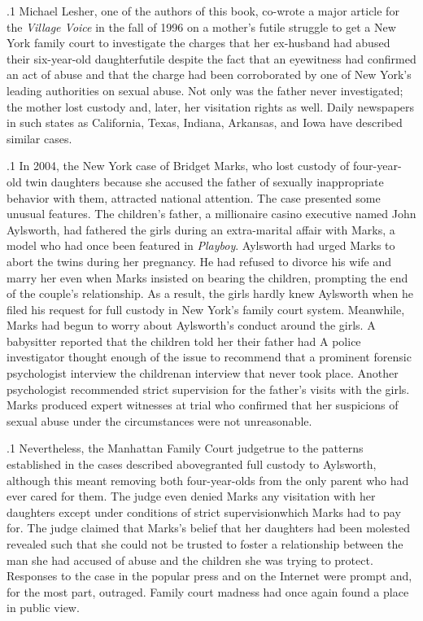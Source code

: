 \documentclass[11pt, twoside]{article}
\begin{document}
{\p.1{%
Michael Lesher, one of the authors of this book, co-wrote
a major article for the \textit{Village Voice} in the fall of 1996 on a mother’s futile struggle
to get a New York family court to investigate the charges that her
ex-husband had abused their six-year-old daughter\mdash{}futile despite the fact
that an eyewitness had confirmed an act of abuse and that the charge had
been corroborated by one of New York’s leading authorities on sexual
abuse. Not only was the father never investigated; the mother lost custody and, later, her visitation rights as well. Daily newspapers in such
states as California, Texas, Indiana, Arkansas, and Iowa have described
similar cases.
}%

\p.1{%
In 2004, the New York case of Bridget Marks, who lost custody of
four-year-old twin daughters because she accused the father of sexually
inappropriate behavior with them, attracted national attention. The case
presented some unusual features. The children’s father, a millionaire
casino executive named John Aylsworth, had fathered the girls during
an extra-marital affair with Marks, a model who had once been featured
in \textit{Playboy}. Aylsworth had urged Marks to abort the twins during her
pregnancy. He had refused to divorce his wife and marry her even when
Marks insisted on bearing the children, prompting the
end of the couple’s relationship. As a result, the girls hardly knew Aylsworth when he
filed his request for full custody in New York’s family court system.
Meanwhile, Marks had begun to worry about Aylsworth’s conduct
around the girls. A babysitter reported that the children told her their father had  A police investigator thought enough
of the issue to recommend that a prominent forensic psychologist interview the children\mdash{}an interview that never took place. Another
psychologist recommended strict supervision for the father’s visits with
the girls. Marks produced expert witnesses at trial who confirmed
that her suspicions of sexual abuse under the circumstances were not
unreasonable.
}%

\p.1{%
Nevertheless, the Manhattan Family Court judge\mdash{}true to the patterns established in the cases described above\mdash{}granted full custody
to Aylsworth, although this meant removing both four-year-olds from
the only parent who had ever cared for them. The judge even denied
Marks any visitation with her daughters except under conditions of
strict supervision\mdash{}which Marks had to pay for. The judge claimed
that Marks’s belief that her daughters had been molested revealed such
 that she could not be trusted to foster a  relationship between the man she had accused of abuse and the children she
was trying to protect. Responses to the case in the popular press and on
the Internet were prompt and, for the most part, outraged. Family court
madness had once again found a place in public view.
}%


}
\end{document}
